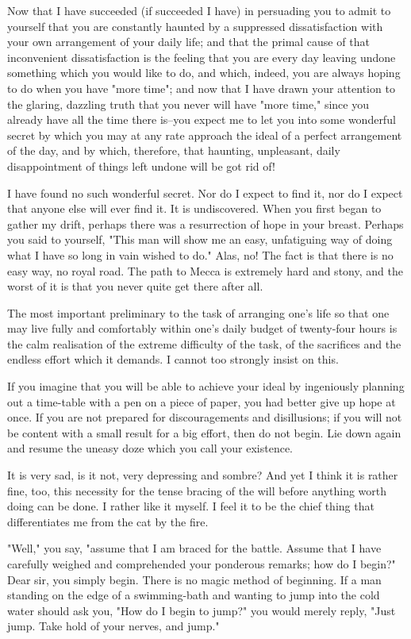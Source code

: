 Now that I have succeeded (if succeeded I have) in persuading you to
admit to yourself that you are constantly haunted by a suppressed
dissatisfaction with your own arrangement of your daily life; and that
the primal cause of that inconvenient dissatisfaction is the feeling
that you are every day leaving undone something which you would like to
do, and which, indeed, you are always hoping to do when you have "more
time"; and now that I have drawn your attention to the glaring,
dazzling truth that you never will have "more time," since you already
have all the time there is--you expect me to let you into some
wonderful secret by which you may at any rate approach the ideal of a
perfect arrangement of the day, and by which, therefore, that haunting,
unpleasant, daily disappointment of things left undone will be got rid
of!

I have found no such wonderful secret.  Nor do I expect to find it, nor
do I expect that anyone else will ever find it.  It is undiscovered.
When you first began to gather my drift, perhaps there was a
resurrection of hope in your breast.  Perhaps you said to yourself,
"This man will show me an easy, unfatiguing way of doing what I have so
long in vain wished to do."  Alas, no!  The fact is that there is no
easy way, no royal road.  The path to Mecca is extremely hard and
stony, and the worst of it is that you never quite get there after all.

The most important preliminary to the task of arranging one's life so
that one may live fully and comfortably within one's daily budget of
twenty-four hours is the calm realisation of the extreme difficulty of
the task, of the sacrifices and the endless effort which it demands.  I
cannot too strongly insist on this.

If you imagine that you will be able to achieve your ideal by
ingeniously planning out a time-table with a pen on a piece of paper,
you had better give up hope at once.  If you are not prepared for
discouragements and disillusions; if you will not be content with a
small result for a big effort, then do not begin.  Lie down again and
resume the uneasy doze which you call your existence.

It is very sad, is it not, very depressing and sombre?  And yet I think
it is rather fine, too, this necessity for the tense bracing of the
will before anything worth doing can be done.  I rather like it myself.
I feel it to be the chief thing that differentiates me from the cat by
the fire.

"Well," you say, "assume that I am braced for the battle.  Assume that
I have carefully weighed and comprehended your ponderous remarks; how
do I begin?"  Dear sir, you simply begin.  There is no magic method of
beginning.  If a man standing on the edge of a swimming-bath and
wanting to jump into the cold water should ask you, "How do I begin to
jump?" you would merely reply, "Just jump. Take hold of your nerves,
and jump."

